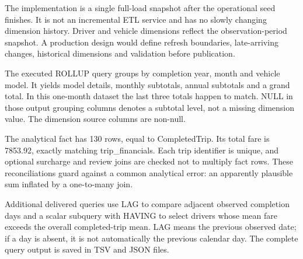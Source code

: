 \documentclass[11pt,a4paper]{article}
\begin{document}
The implementation is a single full-load snapshot after the operational seed finishes. It is not an incremental ETL service and has no slowly changing dimension history. Driver and vehicle dimensions reflect the observation-period snapshot. A production design would define refresh boundaries, late-arriving changes, historical dimensions and validation before publication.


\begin{center}\end{center}
The executed ROLLUP query groups by completion year, month and vehicle model. It yields model details, monthly subtotals, annual subtotals and a grand total. In this one-month dataset the last three totals happen to match. NULL in those output grouping columns denotes a subtotal level, not a missing dimension value. The dimension source columns are non-null.

The analytical fact has 130 rows, equal to CompletedTrip. Its total fare is 7853.92, exactly matching trip\_\allowbreak{}financials. Each trip identifier is unique, and optional surcharge and review joins are checked not to multiply fact rows. These reconciliations guard against a common analytical error: an apparently plausible sum inflated by a one-to-many join.

Additional delivered queries use LAG to compare adjacent observed completion days and a scalar subquery with HAVING to select drivers whose mean fare exceeds the overall completed-trip mean. LAG means the previous observed date; if a day is absent, it is not automatically the previous calendar day. The complete query output is saved in TSV and JSON files.
\end{document}
